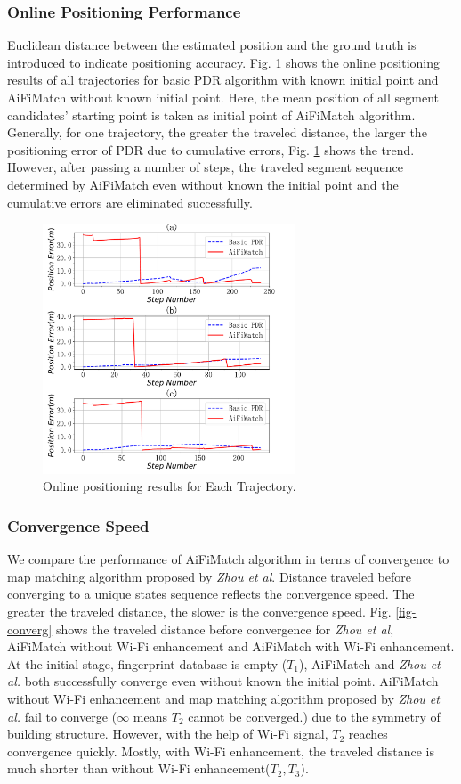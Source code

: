 \documentclass[conference]{IEEEtran}
\begin{document}
\subsubsection{Online Positioning Performance}

Euclidean distance between the estimated position and the ground truth is introduced to indicate positioning accuracy.  Fig. \ref{fig-online} shows the online positioning results of all trajectories for basic PDR algorithm with known initial point and AiFiMatch without known initial point.  Here, the mean position of all segment candidates' starting point is taken as initial point of AiFiMatch algorithm. Generally, for one trajectory, the greater the traveled distance, the larger the positioning error of PDR due to cumulative errors, Fig. \ref{fig-online} shows the trend.  However, after passing a number of steps, the traveled segment sequence determined by AiFiMatch even without known the initial point and the cumulative  errors are eliminated successfully.

\begin{figure}[!htbp]
	\centering
	\includegraphics[width=2.95in]{AiFiMatch-OnlinePosition}
	\caption{Online positioning results for Each Trajectory.}
	\label{fig-online}
\end{figure}

\subsubsection{Convergence Speed}

We compare the performance of AiFiMatch algorithm in terms of convergence to map matching algorithm proposed by \emph{Zhou et al}. Distance traveled before converging to a unique states sequence reflects the convergence speed. The greater the traveled distance, the slower is the convergence speed. Fig. \ref{fig-converg} shows the traveled distance before convergence for \emph{Zhou et al}, AiFiMatch without Wi-Fi enhancement and AiFiMatch with Wi-Fi enhancement. At the initial stage, fingerprint database is empty ($T_1$), AiFiMatch and \emph{Zhou et al.} both successfully converge even without known the initial point. AiFiMatch without Wi-Fi enhancement and map matching algorithm proposed by \emph{Zhou et al.} fail to converge ($\infty$ means $T_2$ cannot be converged.) due to the symmetry of building structure. However, with the help of Wi-Fi signal, $T_2$ reaches convergence quickly. Mostly, with Wi-Fi enhancement, the traveled distance is much shorter than without Wi-Fi enhancement($T_2, T_3$). 
\end{document}
